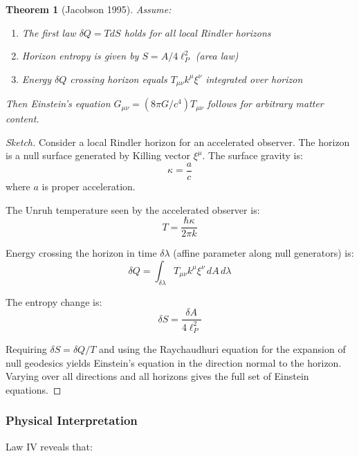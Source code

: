 \documentclass[11pt,a4paper]{article}
\theoremstyle{plain}
\newtheorem{theorem}{Theorem}[section]
\theoremstyle{definition}
\theoremstyle{remark}
\begin{document}
\begin{theorem}[Jacobson 1995]
Assume:
\begin{enumerate}
\item The first law $\delta Q = T dS$ holds for all local Rindler horizons
\item Horizon entropy is given by $S = A/4\ell_P^2$ (area law)
\item Energy $\delta Q$ crossing horizon equals $T_{\mu\nu}k^\mu\xi^\nu$ integrated over horizon
\end{enumerate}
Then Einstein's equation $G_{\mu\nu} = (8\pi G/c^4)T_{\mu\nu}$ follows for arbitrary matter content.
\end{theorem}

\begin{proof}[Sketch]
Consider a local Rindler horizon for an accelerated observer. The horizon is a null surface generated by Killing vector $\xi^\mu$. The surface gravity is:
\begin{equation}
\kappa = \frac{a}{c}
\end{equation}
where $a$ is proper acceleration.

The Unruh temperature seen by the accelerated observer is:
\begin{equation}
T = \frac{\hbar\kappa}{2\pi k}
\end{equation}

Energy crossing the horizon in time $\delta\lambda$ (affine parameter along null generators) is:
\begin{equation}
\delta Q = \int_{\delta\lambda} T_{\mu\nu}k^\mu\xi^\nu\,dA\,d\lambda
\end{equation}

The entropy change is:
\begin{equation}
\delta S = \frac{\delta A}{4\ell_P^2}
\end{equation}

Requiring $\delta S = \delta Q/T$ and using the Raychaudhuri equation for the expansion of null geodesics yields Einstein's equation in the direction normal to the horizon. Varying over all directions and all horizons gives the full set of Einstein equations.
\end{proof}

\subsubsection{Physical Interpretation}

Law IV reveals that:
\end{document}
